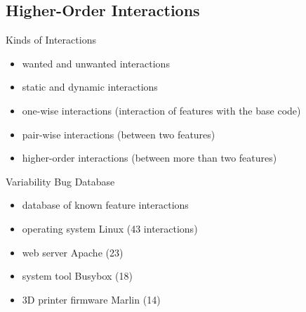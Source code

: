 
\subsection{Higher-Order Interactions}
\begin{frame}{\myframetitle}
	\begin{mycolumns}
		\begin{definition}{Kinds of Interactions}
			\begin{itemize}
				\item wanted and unwanted interactions
				\item static and dynamic interactions
				\item one-wise interactions (interaction of features with the base code)
				\item pair-wise interactions (between two features)
				\item higher-order interactions (between more than two features)
			\end{itemize}
		\end{definition}
		\begin{example}{Variability Bug Database\mysource{\VBDb}}
			\begin{itemize}
				\item database of known feature interactions
				\item operating system Linux (43 interactions)
				\item web server Apache (23)
				\item system tool Busybox (18)
				\item 3D printer firmware Marlin (14)
			\end{itemize}
		\end{example}
	\mynextcolumn
	\end{mycolumns}
\end{frame}


